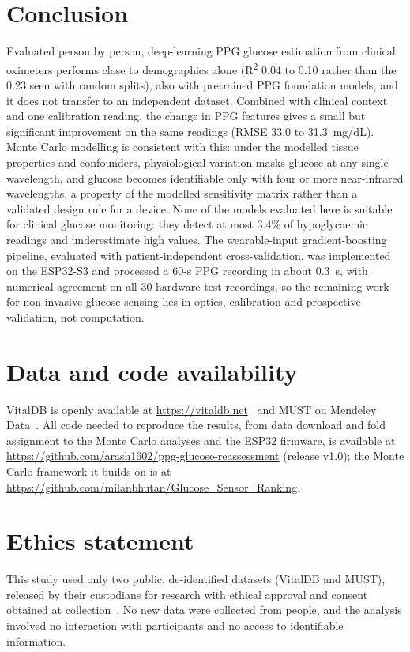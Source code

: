 \documentclass[11pt]{article}
\newcommand{\RR}{R\textsuperscript{2}}
\newcommand{\mgdl}{mg/dL}
\begin{document}
\section{Conclusion}
Evaluated person by person, deep-learning PPG glucose estimation from clinical oximeters performs close to demographics alone (\RR{} 0.04 to 0.10 rather than the 0.23 seen with random splits), also with pretrained PPG foundation models, and it does not transfer to an independent dataset. Combined with clinical context and one calibration reading, the change in PPG features gives a small but significant improvement on the same readings (RMSE 33.0 to 31.3~\mgdl{}). Monte Carlo modelling is consistent with this: under the modelled tissue properties and confounders, physiological variation masks glucose at any single wavelength, and glucose becomes identifiable only with four or more near-infrared wavelengths, a property of the modelled sensitivity matrix rather than a validated design rule for a device. None of the models evaluated here is suitable for clinical glucose monitoring: they detect at most 3.4\% of hypoglycaemic readings and underestimate high values. The wearable-input gradient-boosting pipeline, evaluated with patient-independent cross-validation, was implemented on the ESP32-S3 and processed a 60-s PPG recording in about 0.3~s, with numerical agreement on all 30 hardware test recordings, so the remaining work for non-invasive glucose sensing lies in optics, calibration and prospective validation, not computation.

\section*{Data and code availability}
VitalDB is openly available at \url{https://vitaldb.net}~\citep{lee2022vitaldb} and MUST on Mendeley Data~\citep{must2023}. All code needed to reproduce the results, from data download and fold assignment to the Monte Carlo analyses and the ESP32 firmware, is available at \url{https://github.com/arash1602/ppg-glucose-reassessment} (release v1.0); the Monte Carlo framework it builds on is at \url{https://github.com/milanbhutan/Glucose_Sensor_Ranking}.

\section*{Ethics statement}
This study used only two public, de-identified datasets (VitalDB and MUST), released by their custodians for research with ethical approval and consent obtained at collection~\citep{lee2022vitaldb,must2023}. No new data were collected from people, and the analysis involved no interaction with participants and no access to identifiable information.
\end{document}
